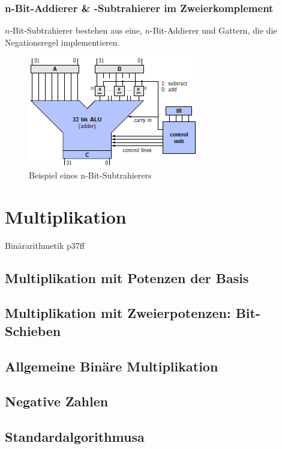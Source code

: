 \documentclass[12pt]{report}
\begin{document}
\subsubsection{n-Bit-Addierer \& -Subtrahierer im Zweierkomplement}
\begin{defbox}
  $n$-Bit-Subtrahierer bestehen aus eine, $n$-Bit-Addierer und Gattern, 
  die die Negationsregel implementieren.
  
\end{defbox}

\begin{figure}[h]
  \caption{Beispiel eines n-Bit-Subtrahierers}
  \centering
  \includegraphics{graphics/n-bit-subtrahierer.png}
\end{figure}

\section{Multiplikation}
Binärarithmetik p37ff
\subsection{Multiplikation mit Potenzen der Basis}
\subsection{Multiplikation mit Zweierpotenzen: Bit-Schieben}
\subsection{Allgemeine Binäre Multiplikation}
\subsection{Negative Zahlen}
\subsection{Standardalgorithmusa}
\end{document}
